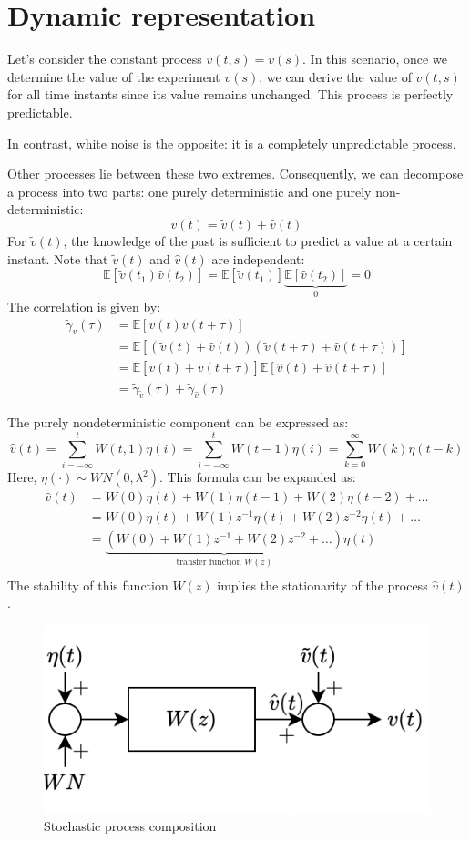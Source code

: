 \section{Dynamic representation}

Let's consider the constant process $v(t,s)=v(s)$. 
In this scenario, once we determine the value of the experiment $v(s)$, we can derive the value of $v(t,s)$ for all time instants since its value remains unchanged.
This process is perfectly predictable.

In contrast, white noise is the opposite: it is a completely unpredictable process. 

Other processes lie between these two extremes.
Consequently, we can decompose a process into two parts: one purely deterministic and one purely non-deterministic:
\[v(t)=\tilde{v}(t)+\widehat{v}(t)\]
For $\tilde{v}(t)$, the knowledge of the past is sufficient to predict a value at a certain instant.
Note that $\tilde{v}(t)$ and $\widehat{v}(t)$ are independent: 
\[\mathbb{E}\left[ \tilde{v}(t_1)\widehat{v}(t_2) \right]=\mathbb{E}\left[ \tilde{v}(t_1)\right]\underbrace{\mathbb{E}\left[\widehat{v}(t_2) \right]}_0 =0\]
The correlation is given by:
\begin{align*}
    \tilde{\gamma}_v(\tau)  &=\mathbb{E}\left[v(t)v(t+\tau)\right] \\
                            &=\mathbb{E}\left[\left(\tilde{v}(t)+\widehat{v}(t)\right)\left(\tilde{v}(t+\tau)+\widehat{v}(t+\tau)\right)\right] \\
                            &=\mathbb{E}\left[\tilde{v}(t)+\tilde{v}(t+\tau)\right]\mathbb{E}\left[\widehat{v}(t)+\widehat{v}(t+\tau)\right] \\
                            &=\tilde{\gamma}_{\tilde{v}}(\tau)+\tilde{\gamma}_{\widehat{v}}(\tau)
\end{align*}

The purely nondeterministic component can be expressed as:
\[\widehat{v}(t)=\sum_{i=-\infty}^{t}W(t,1)\eta(i)=\sum_{i=-\infty}^{t}W(t-1)\eta(i)=\sum_{k=0}^\infty W(k)\eta(t-k)\]
Here, $\eta(\cdot) \sim WN(0,\lambda^2)$. 
This formula can be expanded as:
\begin{align*}
\widehat{v}(t)  &= W(0)\eta(t) + W(1)\eta(t-1) + W(2)\eta(t-2) + \dots \\
                &= W(0)\eta(t) + W(1)z^{-1}\eta(t) + W(2)z^{-2}\eta(t) + \dots \\
                &= \underbrace{\left(W(0) + W(1)z^{-1} + W(2)z^{-2} + \dots\right)}_{\text{transfer function }W(z)} \eta(t)  \\
\end{align*}
The stability of this function $W(z)$ implies the stationarity of the process $\widehat{v}(t)$.
\begin{figure}[H]
    \centering
    \includegraphics[width=0.4\linewidth]{images/dynamic.png} 
    \caption{Stochastic process composition}
\end{figure}

